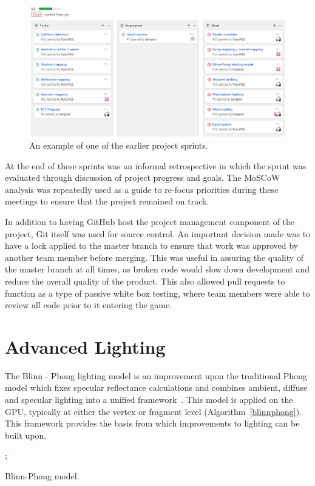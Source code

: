 \documentclass[a4paper, oneside, 11pt]{report}
\begin{document}
\begin{figure}[ht]
\centering
\includegraphics[width=\textwidth]{project-board.png}
\caption{An example of one of the earlier project sprints.}
\label{fig:proj-board}
\end{figure}

At the end of these sprints was an informal retrospective in which the sprint was evaluated through discussion of project progress and goals. The MoSCoW analysis was repeatedly used as a guide to re-focus priorities during these meetings to ensure that the project remained on track. 

In addition to having GitHub host the project management component of the project, Git itself was used for source control. An important decision made was to have a lock applied to the master branch to ensure that work was approved by another team member before merging. This was useful in assuring the quality of the master branch at all times, as broken code would slow down development and reduce the overall quality of the product. This also allowed pull requests to function as a type of passive white box testing, where team members were able to review all code prior to it entering the game. 

\section{Advanced Lighting}
The Blinn - Phong lighting model is an improvement upon the traditional Phong model which fixes specular reflectance calculations and combines ambient, diffuse and specular lighting into a unified framework~\cite{blinn1977models}. This model is applied on the GPU, typically at either the vertex or fragment level (Algorithm~\ref{blinnphong}). This framework provides the basis from which improvements to lighting can be built upon.

\begin{algorithm}[H]
    \begin{algorithmic}[1]
            \ENDFOR
            \ENDFOR
            ;
        \ENDFOR
    \end{algorithmic}
\caption{Blinn-Phong model.}\label{blinnphong}
\end{algorithm}
\end{document}

